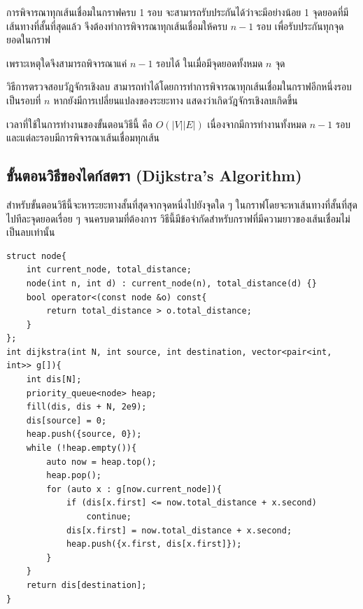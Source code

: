 การพิจารณาทุกเส้นเชื่อมในกราฟครบ 1 รอบ จะสามารถรับประกันได้ว่าจะมีอย่างน้อย 1 จุดยอดที่มีเส้นทางที่สั้นที่สุดแล้ว จึงต้องทำการพิจารณาทุกเส้นเชื่อมให้ครบ $n-1$ รอบ เพื่อรับประกันทุกจุดยอดในกราฟ

\begin{question}
เพราะเหตุใดจึงสามารถพิจารณาแค่ $n-1$ รอบได้ ในเมื่อมีจุดยอดทั้งหมด $n$ จุด
\end{question}

วิธีการตรวจสอบวัฎจักรเชิงลบ สามารถทำได้โดยการทำการพิจารณาทุกเส้นเชื่อมในกราฟอีกหนึ่งรอบเป็นรอบที่ $n$ หากยังมีการเปลี่ยนแปลงของระยะทาง แสดงว่าเกิดวัฎจักรเชิงลบเกิดขึ้น

เวลาที่ใช้ในการทำงานของขั้นตอนวิธีนี้ คือ $O(|V||E|)$ เนื่องจากมีการทำงานทั้งหมด $n-1$ รอบ และแต่ละรอบมีการพิจารณาเส้นเชื่อมทุกเส้น

\subsection{ขั้นตอนวิธีของไดก์สตรา (Dijkstra's Algorithm)}

สำหรับขั้นตอนวิธีนี้จะหาระยะทางสั้นที่สุดจากจุดหนึ่งไปยังจุดใด ๆ ในกราฟโดยจะหาเส้นทางที่สั้นที่สุดไปทีละจุดยอดเรื่อย ๆ จนครบตามที่ต้องการ วิธีนี้มีข้อจำกัดสำหรับกราฟที่มีความยาวของเส้นเชื่อมไม่เป็นลบเท่านั้น

\begin{lstlisting}
struct node{
	int current_node, total_distance;
	node(int n, int d) : current_node(n), total_distance(d) {}
	bool operator<(const node &o) const{
		return total_distance > o.total_distance;
	}
};
int dijkstra(int N, int source, int destination, vector<pair<int, int>> g[]){
	int dis[N];
	priority_queue<node> heap;
	fill(dis, dis + N, 2e9);
	dis[source] = 0;
	heap.push({source, 0});
	while (!heap.empty()){
		auto now = heap.top();
		heap.pop();
		for (auto x : g[now.current_node]){
			if (dis[x.first] <= now.total_distance + x.second)
				continue;
			dis[x.first] = now.total_distance + x.second;
			heap.push({x.first, dis[x.first]});
		}
	}
	return dis[destination];
}
\end{lstlisting}


